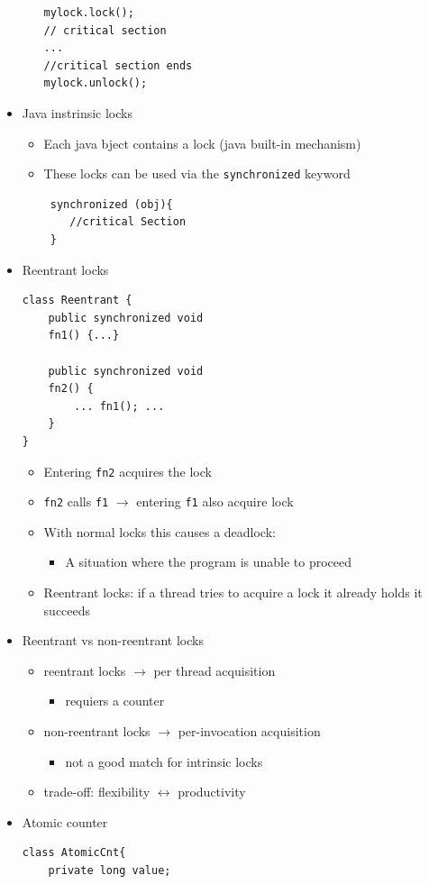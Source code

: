 \documentclass[a4paper]{article}
\newcommand{\inline}[1]{\lstinline!#1!}%
\begin{document}
\begin{itemize}
\begin{itemize}
\begin{lstlisting}
mylock.lock();
// critical section
...
//critical section ends
mylock.unlock();
\end{lstlisting}
 				\end{itemize}
 			\item Java instrinsic locks
 				\begin{itemize}
 					\item Each java bject contains a lock (java built-in mechanism)
 					\item These locks can be used via the \inline{synchronized} keyword
 					\begin{lstlisting}
 synchronized (obj){
 	//critical Section
 }
 					\end{lstlisting}
 				\end{itemize}
 			\item Reentrant locks
 \begin{lstlisting}
class Reentrant {
	public synchronized void
	fn1() {...}

	public synchronized void
	fn2() {
		... fn1(); ...
	}
}
 \end{lstlisting}
 				\begin{itemize}
 					\item Entering \inline{fn2} acquires the lock 
 					\item \inline{fn2} calls \inline{f1} $\to$ entering \inline{f1} also acquire lock
 					\item With normal locks this causes a deadlock:
 						\begin{itemize}
 							\item A situation where the program is unable to proceed
 						\end{itemize}
 					\item Reentrant locks: if a thread tries to acquire a lock it already holds it succeeds
 				\end{itemize}
 			\item Reentrant vs non-reentrant locks
 				\begin{itemize}
 					\item reentrant locks $\to$ per thread acquisition
 						\begin{itemize}
 							\item requiers a counter
 						\end{itemize}
 					\item non-reentrant locks $\to$ per-invocation acquisition
 						\begin{itemize}
 							\item not a good match for intrinsic locks
 						\end{itemize}
 					\item trade-off: flexibility $\leftrightarrow$ productivity 
 				\end{itemize}
 			\item Atomic counter
 			\begin{lstlisting}
class AtomicCnt{
	private long value;


\end{lstlisting}
\end{itemize}
\end{document}
